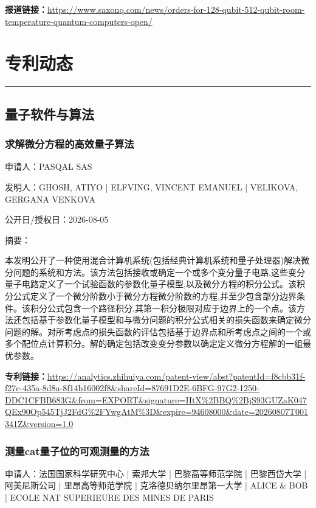\documentclass[12pt,a4paper]{ctexart}
\begin{document}
\noindent\textbf{报道链接：}\url{https://www.saxonq.com/news/orders-for-128-qubit-512-qubit-room-temperature-quantum-computers-open/}



\newpage
\section{专利动态}
\vspace{-0.5em}
\noindent\rule{\linewidth}{1.5pt}

\subsection{ 量子软件与算法 }

\subsubsection{ 求解微分方程的高效量子算法 }

申请人：PASQAL SAS

发明人：GHOSH, ATIYO | ELFVING, VINCENT EMANUEL | VELIKOVA, GERGANA VENKOVA

公开日/授权日：2026-08-05

摘要：

本发明公开了一种使用混合计算机系统(包括经典计算机系统和量子处理器)解决微分问题的系统和方法。该方法包括接收或确定一个或多个变分量子电路,这些变分量子电路定义了一个试验函数的参数化量子模型,以及微分方程的积分公式。该积分公式定义了一个微分阶数小于微分方程微分阶数的方程,并至少包含部分边界条件。该积分公式包含一个路径积分,其第一积分极限对应于边界上的一个点。该方法还包括基于参数化量子模型和与微分问题的积分公式相关的损失函数来确定微分问题的解。对所考虑点的损失函数的评估包括基于边界点和所考虑点之间的一个或多个配位点计算积分。解的确定包括改变变分参数以确定定义微分方程解的一组最优参数。

\noindent\textbf{专利链接：}\url{https://analytics.zhihuiya.com/patent-view/abst?patentId=f8cbb31f-f27c-435a-8d8a-8f14b16002f8&shareId=87691D2E-6BFG-97G2-1250-DDC1CFBB683G&from=EXPORT&signature=HtX%2BBQ%2BjS93GUZaK047QEx90Op545TjJ2FdG%2FYwgAtM%3D&expire=94608000&date=20260807T001341Z&version=1.0}

\subsubsection{ 测量cat量子位的可观测量的方法 }

申请人：法国国家科学研究中心 | 索邦大学 | 巴黎高等师范学院 | 巴黎西岱大学 | 阿美尼斯公司 | 里昂高等师范学院 | 克洛德贝纳尔里昂第一大学 | ALICE \& BOB | ECOLE NAT SUPERIEURE DES MINES DE PARIS
\end{document}
